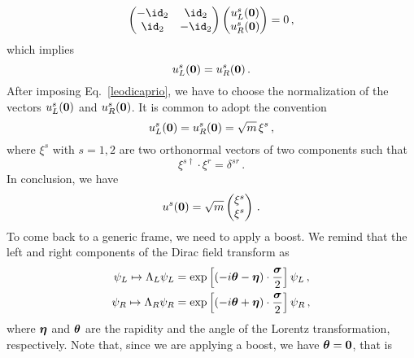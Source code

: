 \begin{sol}
\begin{equation}
        \begin{pmatrix}
            -\id_2 & \id_2 \\
            \id_2 & -\id_2 
        \end{pmatrix}
        \begin{pmatrix}
            u_{L}^s(\vzero) \\
            u_{R}^s(\vzero)
        \end{pmatrix}
        = 0\,,
    \end{equation}
    which implies
    \begin{equation}
    \label{leodicaprio}
        u_{L}^s(\boldsymbol{0}) = u_{R}^s(\boldsymbol{0})\,.
    \end{equation}
    After imposing Eq.~\eqref{leodicaprio}, we have to choose the normalization of the vectors $u_{L}^s(\boldsymbol{0})$ and $u_{R}^s(\boldsymbol{0})$.
    It is common to adopt the convention
    \begin{equation}
    \label{norm_u}
        u_{L}^s(\boldsymbol{0}) = u_{R}^s(\boldsymbol{0}) = \sqrt m \, \xi^s \,,
    \end{equation}
    where $\xi^s$ with $s=1,2$ are two orthonormal vectors of two components such that
    \begin{equation}
        \xi^{s \dagger} \cdot \xi^r = \delta^{sr}\,.
    \end{equation}
    In conclusion, we have
        \begin{equation}
        u^s(\boldsymbol{0}) = 
        \sqrt{m}
        \begin{pmatrix}
            \xi^s \\
            \xi^s
        \end{pmatrix}\,.
    \end{equation}
    To come back to a generic frame, we need to apply a boost. We remind that the left and right components of the Dirac field transform as
    \begin{equation}
    \begin{split}
        \psi_L \mapsto \Lambda_L \psi_L &= \exp \left[ \left( -i \boldsymbol{\theta} - \boldsymbol{\eta} \right) \cdot \frac{\boldsymbol{\sigma}}{2} \right] \psi_L \,,\\
        \psi_R \mapsto \Lambda_R \psi_R &= \exp \left[ \left( -i \boldsymbol{\theta} + \boldsymbol{\eta} \right) \cdot \frac{\boldsymbol{\sigma}}{2} \right] \psi_R \,,
    \end{split}
    \end{equation}
    where $\boldsymbol{\eta}$ and $\boldsymbol{\theta}$ are the rapidity and the angle of the Lorentz transformation, respectively.
    Note that, since we are applying a boost, we have $\boldsymbol{\theta} = \boldsymbol{0}$, that is

\end{sol}
